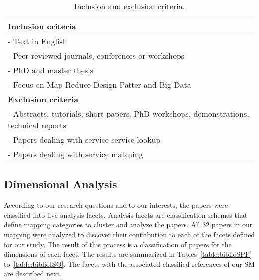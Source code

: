 \begin{table}\centering \small
\begin{tabular}{|l|} \hline
\textbf{Inclusion criteria}		\\ \hline\hline
- Text in English								\\ \hline
- Peer reviewed journals, conferences or workshops	\\ \hline
- PhD and master thesis	\\ \hline
- Focus on Map Reduce Design Patter and Big Data				\\ \hline\hline
\textbf{Exclusion criteria}		\\ \hline\hline	
- Abstracts, tutorials, short papers, PhD workshops, demonstrations, technical reports		\\ \hline	
- Papers dealing with service service lookup		\\ \hline
- Papers dealing with service matching 	\\ \hline
\end{tabular}
\caption{\label{table:criteria} Inclusion and exclusion criteria.}
\end{table}

\subsection{Dimensional Analysis} 

According to our research questions and to our interests, the papers were classified into five analysis facets. 
Analysis facets are classification schemes  that define mapping categories to cluster and analyze the papers. 
All 32 papers in our mapping were analyzed to discover their contribution to
each of the facets defined for our study.
The result of this process is a classification of papers for the dimensions of each facet.
The results are summarized in Tables~\ref{table:biblioSPP} to~\ref{table:biblioISO}.
The facets with the associated classified references of our SM are described next. 

